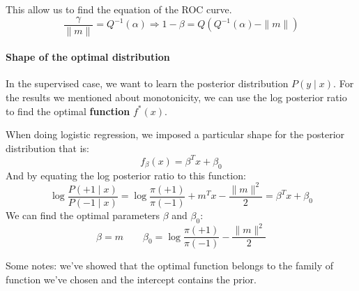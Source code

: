 This allow us to find the equation of the ROC curve.
\[
    \frac{\gamma}{\|m\|} = Q^{-1}(\alpha) \Rightarrow 1-\beta = Q\left(Q^{-1}(\alpha) - \|m\|\right)
\]
\paragraph*{Shape of the optimal distribution}
In the supervised case, we want to learn the posterior distribution $P(y \mid x)$. For the results we mentioned about monotonicity, we can use the log posterior ratio to find the optimal \textbf{function} $f^\ast(x)$.

When doing logistic regression, we imposed a particular shape for the posterior distribution that is:
\[
    f_\beta(x) = \beta^T x + \beta_0
\]
And by equating the log posterior ratio to this function:
\[
    \log \frac{P(+1 \mid x)}{P(-1 \mid x)} = \log\frac{\pi(+1)}{\pi(-1)} + m^T x - \frac{\|m\|^2}{2} = \beta^T x + \beta_0
\]
We can find the optimal parameters $\beta$ and $\beta_0$:
\[
    \beta = m \qquad \beta_0 = \log\frac{\pi(+1)}{\pi(-1)} - \frac{\|m\|^2}{2}
\]

Some notes: we've showed that the optimal function belongs to the family of function we've chosen and the intercept contains the prior.
